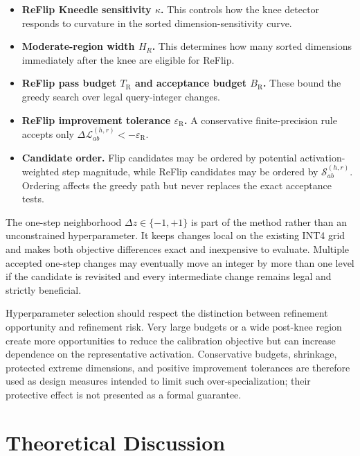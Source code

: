 \begin{itemize}
\item \textbf{ReFlip Kneedle sensitivity $\kappa$.} This controls how the knee detector responds to curvature in the sorted dimension-sensitivity curve.

\item \textbf{Moderate-region width $H_R$.} This determines how many sorted dimensions immediately after the knee are eligible for ReFlip.

\item \textbf{ReFlip pass budget $T_{\mathrm{R}}$ and acceptance budget $B_{\mathrm{R}}$.} These bound the greedy search over legal query-integer changes.

\item \textbf{ReFlip improvement tolerance $\varepsilon_{\mathrm{R}}$.} A conservative finite-precision rule accepts only $\Delta\mathcal{L}^{(h,r)}_{ab}<-\varepsilon_{\mathrm{R}}$.

\item \textbf{Candidate order.} Flip candidates may be ordered by potential activation-weighted step magnitude, while ReFlip candidates may be ordered by $\mathcal{S}^{(h,r)}_{ab}$. Ordering affects the greedy path but never replaces the exact acceptance tests.
\end{itemize}

The one-step neighborhood $\Delta z\in\{-1,+1\}$ is part of the method rather than an unconstrained hyperparameter. It keeps changes local on the existing INT4 grid and makes both objective differences exact and inexpensive to evaluate. Multiple accepted one-step changes may eventually move an integer by more than one level if the candidate is revisited and every intermediate change remains legal and strictly beneficial.

Hyperparameter selection should respect the distinction between refinement opportunity and refinement risk. Very large budgets or a wide post-knee region create more opportunities to reduce the calibration objective but can increase dependence on the representative activation. Conservative budgets, shrinkage, protected extreme dimensions, and positive improvement tolerances are therefore used as design measures intended to limit such over-specialization; their protective effect is not presented as a formal guarantee.

\section{Theoretical Discussion}

